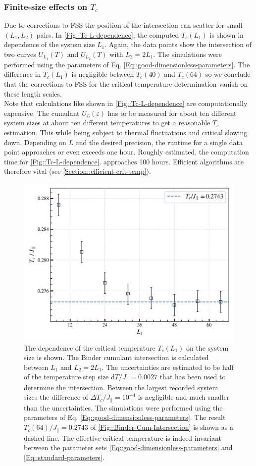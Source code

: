 	\subsubsection{Finite-size effects on ${T_c}$}
	Due to corrections to FSS the position of the intersection can scatter for small $(L_1, L_2)$ pairs. In \autoref{Fig::Tc-L-dependence}, the computed $T_c(L_1)$ is shown in dependence of the system size $L_1$. Again, the data points show the intersection of two curves $U_{L_1}(T)$ and $U_{L_2}(T)$ with $L_2 =	2 L_1$. The simulations were performed using the parameters of Eq. \eqref{Eq::good-dimensionless-parameters}. The difference in $T_c(L_1)$ is negligible between $T_c(40)$ and $T_c(64)$ so we conclude that the corrections to FSS for the critical temperature determination vanish on these length scales.  \\
	
	Note that calculations like shown in \autoref{Fig::Tc-L-dependence} are computationally expensive. The cumulant $U_L(\varepsilon)$ has to be measured for about ten different system sizes at about ten different temperatures to get a reasonable $T_c$ estimation. This while being subject to thermal fluctuations and critical slowing down. Depending on $L$ and the desired precision, the runtime for a single data point approaches or even exceeds one hour.  Roughly estimated, the computation time for \autoref{Fig::Tc-L-dependence}. approaches 100 hours. Efficient algorithms are therefore vital (see \autoref{Section::efficient-crit-temp}).
	\begin{figure}[tb]
		\centering
		\includegraphics[width=0.8\linewidth]{graphics/Tc_L-5.png}
		\caption{The dependence of the critical temperature $T_c(L_1)$ on the system size is shown. The Binder cumulant intersection is calculated between $L_1$ and $L_{2} =	2 L_{1}$. The uncertainties are estimated to be half of the temperature step size $\text{d}T /	J_\parallel = 0.0027$ that has been used to determine the intersection. Between the largest recorded system sizes the difference of $\Delta T_c /	J_\parallel = 10^{-4}$ is negligible and much smaller than the uncertainties. The simulations were performed using the parameters of Eq. \eqref{Eq::good-dimensionless-parameters}. The result $T_c(64) / J_\parallel =	0.2743$ of \autoref{Fig::Binder-Cum-Intersection} is shown as a dashed line. The effective critical temperature is indeed invariant between the parameter sets \eqref{Eq::good-dimensionless-parameters} and \eqref{Eq::standard-parameters}.}
		\label{Fig::Tc-L-dependence}
	\end{figure}
